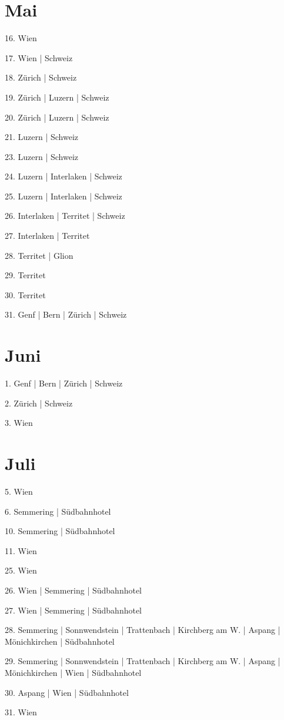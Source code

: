 \documentclass[twoside=false,titlepage=false,open=any, parskip=never, fontsize=10pt, headings=small, chapterprefix=false, appendixprefix=false, DIV=15]{scrbook}
\begin{document}
\begin{multicols}{3}
            \section*{Mai}
            16. Wien\par
            17. Wien | Schweiz\par
            18. Zürich | Schweiz\par
            19. Zürich | Luzern | Schweiz\par
            20. Zürich | Luzern | Schweiz\par
            21. Luzern | Schweiz\par
            23. Luzern | Schweiz\par
            24. Luzern | Interlaken | Schweiz\par
            25. Luzern | Interlaken | Schweiz\par
            26. Interlaken | Territet | Schweiz\par
            27. Interlaken | Territet\par
            28. Territet | Glion\par
            29. Territet\par
            30. Territet\par
            31. Genf | Bern | Zürich | Schweiz\par
            \section*{Juni}
            1. Genf | Bern | Zürich | Schweiz\par
            2. Zürich | Schweiz\par
            3. Wien\par
            \section*{Juli}
            5. Wien\par
            6. Semmering | Südbahnhotel\par
            10. Semmering | Südbahnhotel\par
            11. Wien\par
            25. Wien\par
            26. Wien | Semmering | Südbahnhotel\par
            27. Wien | Semmering | Südbahnhotel\par
            28. Semmering | Sonnwendstein | Trattenbach | Kirchberg am W. | Aspang | Mönichkirchen | Südbahnhotel\par
            29. Semmering | Sonnwendstein | Trattenbach | Kirchberg am W. | Aspang | Mönichkirchen | Wien | Südbahnhotel\par
            30. Aspang | Wien | Südbahnhotel\par
            31. Wien\par

\end{multicols}
\end{document}
